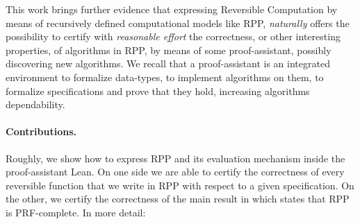 \documentclass[runningheads]{llncs}
\newcommand{\RPP}{\textsf{RPP}\xspace}
\newcommand{\PRF}{\textsf{PRF}\xspace}
\newcommand{\LEAN}{\textsf{Lean}\xspace}
\begin{document}
This work brings further evidence that expressing Reversible Computation by means of recursively defined computational models like \RPP, \emph{naturally} offers the possibility to certify with \emph{reasonable effort} the correctness, or other interesting properties, of algorithms in \RPP, by means of some proof-assistant, possibly discovering new algorithms.
We recall that a proof-assistant is an integrated environment to formalize data-types, to implement algorithms on them, to formalize specifications and prove that they hold, increasing algorithms dependability.

\paragraph{Contributions.}
Roughly, we show how to express \RPP and its evaluation mechanism inside the proof-assistant \LEAN \cite{Lean3}. On one side we are able to certify the correctness of every reversible function that we write in \RPP with respect to a given specification. On the other, we certify the correctness of the main result in \cite{DBLP:journals/tcs/PaoliniPR20} which states that \RPP is \PRF-complete. In more detail:
\end{document}
